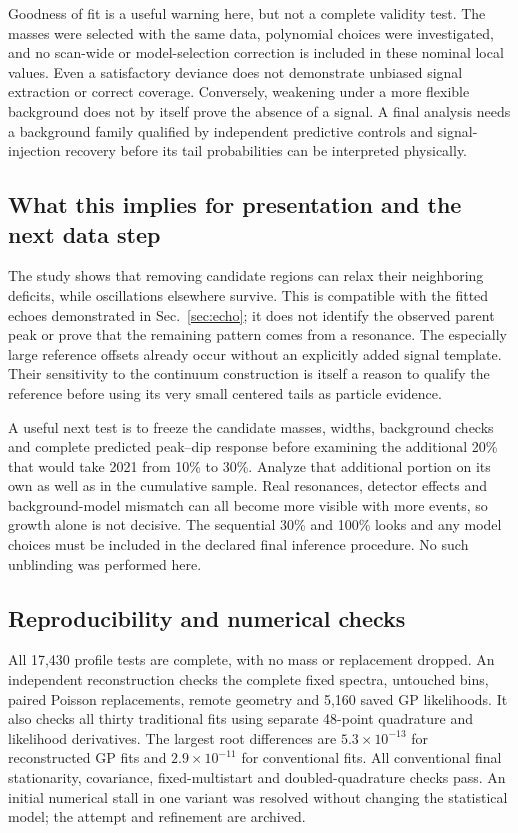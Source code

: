 Goodness of fit is a useful warning here, but not a complete validity test. The masses were selected with the same data, polynomial choices were investigated, and no scan-wide or model-selection correction is included in these nominal local values. Even a satisfactory deviance does not demonstrate unbiased signal extraction or correct coverage. Conversely, weakening under a more flexible background does not by itself prove the absence of a signal. A final analysis needs a background family qualified by independent predictive controls and signal-injection recovery before its tail probabilities can be interpreted physically.

\subsection*{What this implies for presentation and the next data step}
The study shows that removing candidate regions can relax their neighboring deficits, while oscillations elsewhere survive. This is compatible with the fitted echoes demonstrated in Sec.~\ref{sec:echo}; it does not identify the observed parent peak or prove that the remaining pattern comes from a resonance. The especially large reference offsets already occur without an explicitly added signal template. Their sensitivity to the continuum construction is itself a reason to qualify the reference before using its very small centered tails as particle evidence.

A useful next test is to freeze the candidate masses, widths, background checks and complete predicted peak--dip response before examining the additional 20\% that would take 2021 from 10\% to 30\%. Analyze that additional portion on its own as well as in the cumulative sample. Real resonances, detector effects and background-model mismatch can all become more visible with more events, so growth alone is not decisive. The sequential 30\% and 100\% looks and any model choices must be included in the declared final inference procedure. No such unblinding was performed here.

\subsection*{Reproducibility and numerical checks}
All 17,430 profile tests are complete, with no mass or replacement dropped. An independent reconstruction checks the complete fixed spectra, untouched bins, paired Poisson replacements, remote geometry and 5,160 saved GP likelihoods. It also checks all thirty traditional fits using separate 48-point quadrature and likelihood derivatives. The largest root differences are $5.3\times10^{-13}$ for reconstructed GP fits and $2.9\times10^{-11}$ for conventional fits. All conventional final stationarity, covariance, fixed-multistart and doubled-quadrature checks pass. An initial numerical stall in one variant was resolved without changing the statistical model; the attempt and refinement are archived.

